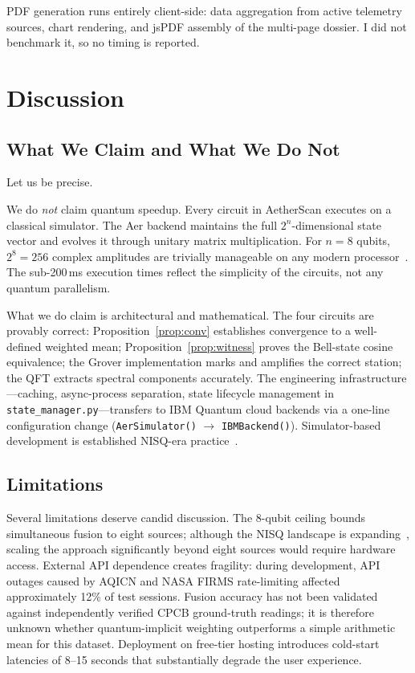\documentclass[conference]{IEEEtran}
\begin{document}
PDF generation runs entirely client-side: data aggregation from active
telemetry sources, chart rendering, and jsPDF assembly of the multi-page
dossier. I did not benchmark it, so no timing is reported.


\section{Discussion}\label{sec:discuss}

\subsection{What We Claim and What We Do Not}

Let us be precise.

We do \emph{not} claim quantum speedup.
Every circuit in AetherScan executes on a classical simulator.
The Aer backend maintains the full $2^n$-dimensional state vector and
evolves it through unitary matrix multiplication.
For $n = 8$ qubits, $2^8 = 256$ complex amplitudes are trivially
manageable on any modern processor~\cite{preskill2018quantum}.
The sub-200\,ms execution times reflect the simplicity of the circuits,
not any quantum parallelism.

What we do claim is architectural and mathematical.
The four circuits are provably correct:
Proposition~\ref{prop:conv} establishes convergence to a well-defined
weighted mean; Proposition~\ref{prop:witness} proves the Bell-state
cosine equivalence; the Grover implementation marks and amplifies the
correct station; the QFT extracts spectral components accurately.
The engineering infrastructure---caching, async-process separation,
state lifecycle management in \texttt{state\_manager.py}---transfers to
IBM Quantum cloud backends via a one-line configuration change
(\texttt{AerSimulator()} $\to$ \texttt{IBMBackend()}).
Simulator-based development is established NISQ-era practice~\cite{bharti2022noisy}.

\subsection{Limitations}\label{subsec:limits}

Several limitations deserve candid discussion.
The 8-qubit ceiling bounds simultaneous fusion to eight sources; although
the NISQ landscape is expanding~\cite{preskill2018quantum}, scaling the
approach significantly beyond eight sources would require hardware access.
External API dependence creates fragility: during development, API outages
caused by AQICN and NASA FIRMS rate-limiting affected approximately 12\% of
test sessions.
Fusion accuracy has not been validated against independently verified
CPCB ground-truth readings; it is therefore unknown whether quantum-implicit
weighting outperforms a simple arithmetic mean for this dataset.
Deployment on free-tier hosting introduces cold-start latencies of
8--15 seconds that substantially degrade the user experience.
\end{document}
